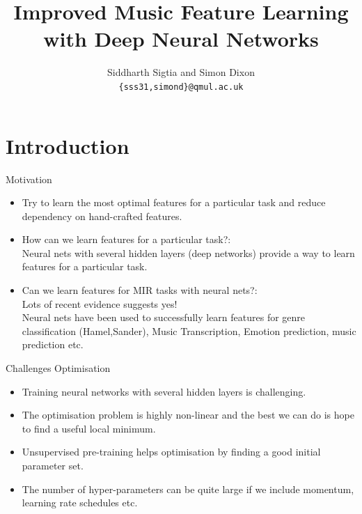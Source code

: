 \documentclass{beamer}
\title[Feature Learning with Neural Nets]{\Large{Improved Music Feature Learning with Deep Neural Networks} }
\author[S. Sigtia and S. Dixon]{Siddharth Sigtia and Simon Dixon\\ \texttt{\scriptsize{\{sss31,simond\}@qmul.ac.uk}}}
\institute[C4DM]{Centre for Digital Music\\Queen Mary University of London}
\date{}
\begin{document}
\begin{frame}
  \titlepage


  
\end{frame}


\section{Introduction}


\begin{frame}{Motivation}
\vspace{-0.15in}
  \begin{itemize}
  \item Try to learn the most optimal features for a particular task and reduce dependency on hand-crafted features.
  \item { How can we learn features for a particular task?}:
    \\Neural nets with several hidden layers (deep networks) provide a way to learn features for a particular task.  
  \item { Can we learn features for MIR tasks with neural nets?}: 
    \\Lots of recent evidence suggests yes! 
    \\Neural nets have been used to successfully learn features for genre classification (Hamel,Sander), Music Transcription, Emotion prediction, music prediction etc. 

  \end{itemize}
\end{frame}

\begin{frame}{Challenges}
Optimisation
  \begin{itemize}
    \item Training neural networks with several hidden layers is challenging. 
    \item The optimisation problem is highly non-linear and the best we can do is hope to find a useful local minimum. 
    \item Unsupervised pre-training helps optimisation by finding a good initial parameter set.
    \item The number of hyper-parameters can be quite large if we include momentum, learning rate schedules etc.   
  \end{itemize}
\end{frame}
\end{document}
